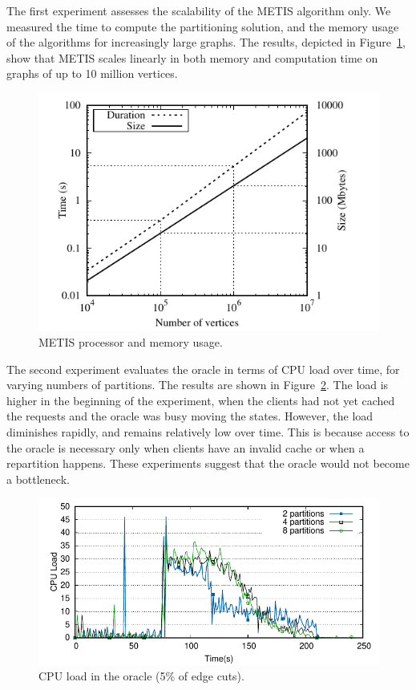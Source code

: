 The first experiment assesses the scalability of the METIS algorithm only.
We measured the time to compute the partitioning solution, and
the memory usage of the algorithms for increasingly large graphs. 
The results, depicted in Figure~\ref{fig:metis_size_time}, show that METIS scales
linearly in both memory and computation time on graphs of up to 10 million vertices.

\begin{figure}[ht!]
  \centering
    \includegraphics[width=\columnwidth]{figures/metis_size_time}
	\caption{METIS processor and memory usage.}
	\label{fig:metis_size_time}
\end{figure}

The second experiment evaluates the oracle in terms of CPU load over
time, for varying numbers of partitions. The results are shown in
Figure~\ref{fig:cpu_oracle}. The load is higher in the
beginning of the experiment, when the clients had not yet cached the
requests and the oracle was busy moving the states. However, the load diminishes rapidly, and remains relatively
low over time. This is because access to the oracle is necessary only
when clients have an invalid cache or when a repartition happens. These experiments
suggest that the oracle would not become a bottleneck.%

\begin{figure}[ht]
	\includegraphics[width=\columnwidth]{figures/experiments/social-network-oracle-load/social-network-oracle-load}
  \caption{CPU load in the oracle (5\% of edge cuts).}
	\label{fig:cpu_oracle}
\end{figure}

